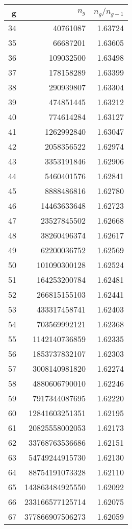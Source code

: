 \documentclass[reqno,11pt]{amsart}
\theoremstyle{plain}
\theoremstyle{definition}
\begin{document}
\begin{minipage}{0.5\textwidth}
\begin{tabular}{|r|r|r|}
\hline
g & $n_g$ & $n_g/n_{g-1}$\\
\hline
34 & 40761087 & 1.63724 \\
35 & 66687201 & 1.63605 \\
36 & 109032500 & 1.63498 \\
37 & 178158289 & 1.63399 \\
38 & 290939807 & 1.63304 \\
39 & 474851445 & 1.63212 \\
40 & 774614284 & 1.63127 \\
41 & 1262992840 & 1.63047 \\
42 & 2058356522 & 1.62974 \\
43 & 3353191846 & 1.62906 \\
44 & 5460401576 & 1.62841 \\
45 & 8888486816 & 1.62780 \\
46 & 14463633648 & 1.62723 \\
47 & 23527845502 & 1.62668 \\
48 & 38260496374 & 1.62617 \\
49 & 62200036752 & 1.62569 \\
50 & 101090300128 & 1.62524 \\
51 & 164253200784 & 1.62481 \\
52 & 266815155103 & 1.62441 \\
53 & 433317458741 & 1.62403 \\
54 & 703569992121 & 1.62368 \\
55 & 1142140736859 & 1.62335 \\
56 & 1853737832107 & 1.62303 \\
57 & 3008140981820 & 1.62274 \\
58 & 4880606790010 & 1.62246 \\
59 & 7917344087695 & 1.62220 \\
60 & 12841603251351 & 1.62195 \\
61 & 20825558002053 & 1.62173 \\
62 & 33768763536686 & 1.62151 \\
63 & 54749244915730 & 1.62130 \\
64 & 88754191073328 & 1.62110 \\
65 & 143863484925550 & 1.62092 \\
66 & 233166577125714 & 1.62075 \\
67 & 377866907506273 & 1.62059 \\\hline
\end{tabular}
\end{minipage}
\vspace{2em}
\end{document}
